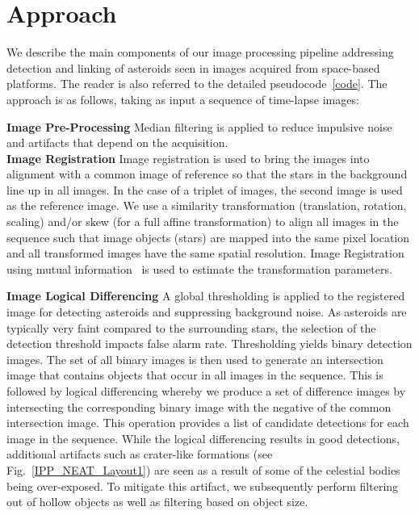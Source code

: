 \documentclass{article}
\begin{document}

\section{Approach}
\label{sec:approach}

We describe the main components of our image processing pipeline addressing detection and linking of asteroids seen in images acquired from space-based platforms. The reader is also referred to the 
detailed pseudocode~\ref{code}.  The approach is as follows, taking as input a sequence of time-lapse images:

\noindent
{\bf Image Pre-Processing} Median filtering is applied  to reduce impulsive noise and artifacts that depend on the acquisition.\\
{\bf Image Registration}
Image registration is used to bring the images into alignment with a common image of reference so that the stars in the background line up in all images.  In the case of a triplet of images, the second image is used as the reference image.  We use a similarity transformation (translation, rotation, scaling) and/or skew (for a full affine transformation) to align all images in the sequence such that image objects (stars) are mapped into the same pixel location and all transformed images have the same spatial resolution.  Image Registration using mutual information~\cite{viola1997alignment} is used to estimate the transformation parameters.

{\bf Image Logical Differencing}
A global thresholding is applied to the registered image for detecting asteroids and suppressing background noise.  As asteroids are typically very faint compared to the surrounding stars, the selection of the detection threshold impacts false alarm rate.  Thresholding yields binary detection images.  The set of all binary images is then used to generate an intersection image that contains objects that occur in all images in the sequence.  This is followed by logical differencing whereby we produce a set of difference images by intersecting the corresponding binary image with the negative of the common intersection image.  This operation provides a list of candidate detections for each image in the sequence.  While the logical differencing results in good detections, additional artifacts such as crater-like formations (see Fig.~\ref{IPP_NEAT_Layout1}) are seen as a result of some of the celestial bodies being over-exposed.  To mitigate this artifact, we subsequently perform filtering out of hollow objects as well as filtering based on object size.
\end{document}

